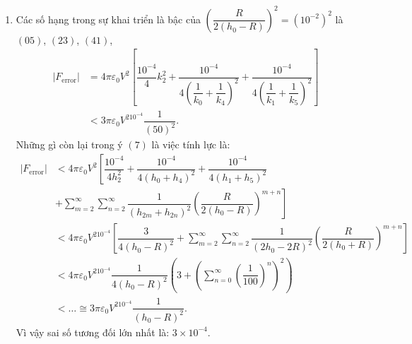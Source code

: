 \begin{loigiai}
\begin{enumerate}
\begin{enumerate}[1) ]
        \item Các số hạng trong sự khai triển là bậc của $\left(\dfrac{R}{2(h_0-R)}\right)^2=(10^{-2})^2$ là $(05)$, $(23)$, $(41)$,
        \begin{align*}
            \left|F_{\mathrm{error}}\right|&=4\pi\varepsilon_0V^2\left[\dfrac{10^{-4}}{4}k_2^2+\dfrac{10^{-4}}{4\left(\dfrac{1}{k_0}+\dfrac{1}{k_4}\right)^2}+\dfrac{10^{-4}}{4\left(\dfrac{1}{k_1}+\dfrac{1}{k_5}\right)^2}\right]\\
            &<3\pi\varepsilon_0V^210^{-4}\dfrac{1}{(50)^2}.
        \end{align*}
        Những gì còn lại trong ý $(7)$ là việc tính lực là:
        \begin{align*}
             \left|F_{\mathrm{error}}\right|&<4\pi\varepsilon_0V^2\left[\dfrac{10^{-4}}{4h_2^2}+\dfrac{10^{-4}}{4(h_0+h_4)^2}+\dfrac{10^{-4}}{4(h_1+h_5)^2}\right.\\
             &\left. +\sum_{m=2}^{\infty}\sum_{n=2}^{\infty}\dfrac{1}{(h_{2m}+h_{2n})^2}\left(\dfrac{R}{2(h_0-R)}\right)^{m+n}\right]\\
             &<4\pi\varepsilon_0V^210^{-4}\left[\dfrac{3}{4(h_0-R)^2}+\sum_{m=2}^{\infty}\sum_{n=2}^{\infty}\dfrac{1}{(2h_0-2R)^2}\left(\dfrac{R}{2(h_0+R)}\right)^{m+n}\right]\\
             &<4\pi\varepsilon_0V^210^{-4}\dfrac{1}{4(h_0-R)^2}\left(3+\left(\sum_{n=0}^{\infty}\left(\dfrac{1}{100}\right)^{n}\right)^2\right)\\
             &<\dots\cong 3\pi\varepsilon_0V^210^{-4}\dfrac{1}{(h_0-R)^2}.
        \end{align*}
        Vì vậy sai số tương đối lớn nhất là: $3\times10^{-4}$.
    \end{enumerate}
\end{enumerate}
\end{loigiai}

